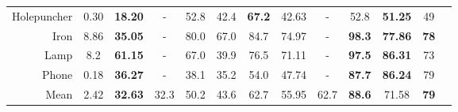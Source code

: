 {{\begin{table}[t]
\begin{adjustbox}{max width=\textwidth}
\begin{tabular}{r|cc|ccccccc|ccc}
			Holepuncher & 0.30 &\textbf{18.20}& -& 	52.8& 42.4& \textbf{67.2}& 42.63   & -& 52.8 & \textbf{51.25}&49\\
			Iron & 8.86 &\textbf{35.05} &       -& 	80.0& 67.0& 84.7& 74.97   & -& \textbf{98.3} & \textbf{77.86}&\textbf{78}\\
			Lamp & 8.2 & \textbf{61.15} &       -& 	67.0& 39.9& 76.5& 71.11   & -& \textbf{97.5} & \textbf{86.31}&73\\
			Phone & 0.18 &\textbf{36.27} &      -& 	38.1& 35.2& 54.0& 47.74   & -& \textbf{87.7} & \textbf{86.24}&79\\
			\midrule
			Mean &  2.42& \textbf{32.63}  & 32.3   & 50.2 & 43.6& 62.7 & 55.95  & 62.7 & \textbf{88.6} & 71.58 & \textbf{79}
		\end{tabular}
	\end{adjustbox}
	\label{tab:linemod}
\end{table}



}}
